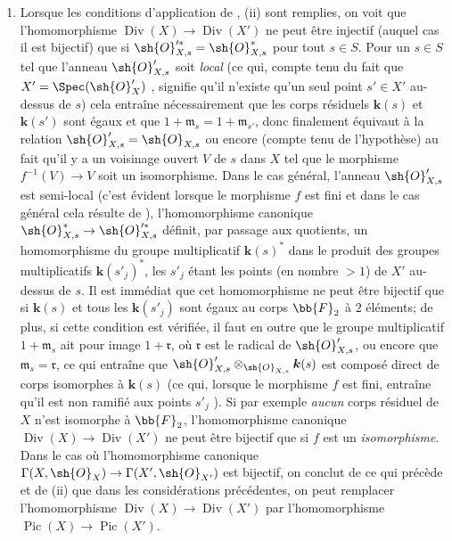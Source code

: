 \begin{remark}[21.8.6]
\begin{enumerate}[label=(\roman*)]
  \item Lorsque les conditions d'application de , (ii) sont remplies, on voit que l'homomorphisme $\operatorname{Div}(X)\to\operatorname{Div}(X')$ ne peut être injectif (auquel cas il est bijectif) que si $\sh{O}'^{*}_{X,s}=\sh{O}^*_{X,s}$ pour tout $s\in S$.
Pour un $s\in S$ tel que l'anneau $\sh{O}'_{X,s}$ soit \emph{local} (ce qui, compte tenu du fait que $X'=\Spec(\sh{O}'_X)$ , signifie qu'il n'existe qu'un seul point $s'\in X'$ au-dessus de $s$) cela entraîne nécessairement que les corps résiduels $\boldsymbol{k}(s)$ et $\boldsymbol{k}(s')$ sont égaux et que $1+\mathfrak{m}_s=1+\mathfrak{m}_{s'}$, donc finalement équivaut à la relation $\sh{O}'_{X,s}=\sh{O}_{X,s}$ ou encore (compte tenu de l'hypothèse) au fait qu'il y a un voisinage ouvert $V$ de $s$ dans $X$ tel que le morphisme $f^{-1}(V)\to V$ soit un isomorphisme.
Dans le cas général, l'anneau $\sh{O}'_{X,s}$ est semi-local (c'est évident lorsque le morphisme $f$ est fini et dans le cas général cela résulte de ), l'homomorphisme canonique $\sh{O}^{*}_{X,s}\to\sh{O}'^{*}_{X,s}$ définit, par passage aux quotients, un homomorphisme du groupe multiplicatif $\boldsymbol{k}(s)^*$ dans le produit des groupes multiplicatifs $\boldsymbol{k}(s'_j)^*$, les $s'_j$ étant les points (en
nombre $>1$) de $X'$ au-dessus de $s$.
Il est immédiat que cet homomorphisme ne peut être bijectif que si $\boldsymbol{k}(s)$ et tous les $\boldsymbol{k}(s'_j)$ sont égaux au corps $\bb{F}_2$ à $2$ éléments;
de plus, si cette condition est vérifiée, il faut en outre que le groupe multiplicatif $1+\mathfrak{m}_s$ ait pour image $1+\mathfrak{r}$, où $\mathfrak{r}$ est le radical de $\sh{O}'_{X,s}$, ou encore que $\mathfrak{m}_s=\mathfrak{r}$, ce qui entraîne que $\sh{O}'_{X,s}\otimes_{\sh{O}_{X,s}}\boldsymbol{k}(s)$ est composé direct de corps isomorphes à $\boldsymbol{k}(s)$ (ce qui, lorsque le morphisme $f$ est fini, entraîne qu'il est non ramifié aux points $s'_j$ ).
Si par exemple \emph{aucun} corps résiduel de $X$ n'est isomorphe à $\bb{F}_2$, l'homomorphisme canonique $\operatorname{Div}(X)\to\operatorname{Div}(X')$ ne peut être bijectif que si $f$ est un \emph{isomorphisme}.
Dans le cas où l'homomorphisme canonique $\Gamma(X,\sh{O}_X)\to\Gamma(X',\sh{O}_{X'})$ est bijectif, on conclut de ce qui précède et de (ii) que dans les considérations précédentes, on peut remplacer l'homomorphisme $\operatorname{Div}(X)\to\operatorname{Div}(X')$ par l'homomorphisme $\operatorname{Pic}(X)\to\operatorname{Pic}(X')$.
\end{enumerate}
\end{remark}

